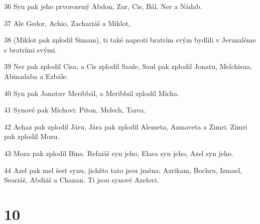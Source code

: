 \par 36 Syn pak jeho prvorozený Abdon, Zur, Cis, Bál, Ner a Nádab.
\par 37 Ale Gedor, Achio, Zachariáš a Miklot,
\par 38 (Miklot pak zplodil Simam), ti také naproti bratrím svým bydlili v Jeruzaléme s bratrími svými.
\par 39 Ner pak zplodil Cisa, a Cis zplodil Saule, Saul pak zplodil Jonatu, Melchisua, Abinadaba a Ezbále.
\par 40 Syn pak Jonatuv Meribbál, a Meribbál zplodil Mícha.
\par 41 Synové pak Míchovi: Piton, Melech, Tarea.
\par 42 Achaz pak zplodil Járu, Jára pak zplodil Alemeta, Azmaveta a Zimri. Zimri pak zplodil Mozu.
\par 43 Moza pak zplodil Bina. Refaiáš syn jeho, Elasa syn jeho, Azel syn jeho.
\par 44 Azel pak mel šest synu, jichžto tato jsou jména: Azrikam, Bochru, Izmael, Seariáš, Abdiáš a Chanan. Ti jsou synové Azelovi.

\chapter{10}


